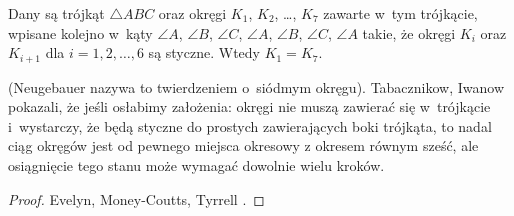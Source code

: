 %

\begin{proposition}
%
    Dany są trójkąt $\triangle ABC$ oraz okręgi $K_1$, $K_2$, \ldots, $K_7$ zawarte w~tym trójkącie, wpisane kolejno w~kąty $\angle A$, $\angle B$, $\angle C$, $\angle A$, $\angle B$, $\angle C$, $\angle A$ takie, że okręgi $K_i$ oraz $K_{i+1}$ dla $i = 1, 2, \ldots, 6$ są styczne.
    Wtedy $K_1 = K_7$.
\end{proposition}

(Neugebauer \cite[s. 101]{neugebauer_2018} nazywa to twierdzeniem o~siódmym okręgu).
Tabacznikow, Iwanow \cite{ivanov_tabachnikov_2016} pokazali, że jeśli osłabimy założenia: okręgi nie muszą zawierać się w~trójkącie i~wystarczy, że będą styczne do prostych zawierających boki trójkąta, to nadal ciąg okręgów jest od pewnego miejsca okresowy z okresem równym sześć, ale osiągnięcie tego stanu może wymagać dowolnie wielu kroków.
%
%

\begin{proof}
    Evelyn, Money-Coutts, Tyrrell \cite[s. 49–58]{evelyn_money_coutts_tyrrell_1974}.
%
%
%
\end{proof}

%